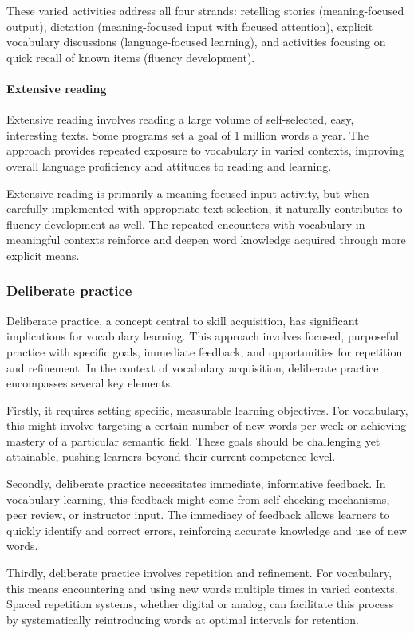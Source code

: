 These varied activities address all four strands: retelling stories (meaning-focused output), dictation (meaning-focused input with focused attention), explicit vocabulary discussions (language-focused learning), and activities focusing on quick recall of known items (fluency development).

\paragraph*{Extensive reading} Extensive reading involves reading a large volume of self-selected, easy, interesting texts. Some programs set a goal of 1 million words a year. The approach provides repeated exposure to vocabulary in varied contexts, improving overall language proficiency and attitudes to reading and learning.

Extensive reading is primarily a meaning-focused input activity, but when carefully implemented with appropriate text selection, it naturally contributes to fluency development as well. The repeated encounters with vocabulary in meaningful contexts reinforce and deepen word knowledge acquired through more explicit means.

\subsubsection{Deliberate practice}\label{sec:delib}

Deliberate practice, a concept central to skill acquisition, has significant implications for vocabulary learning. This approach involves focused, purposeful practice with specific goals, immediate feedback, and opportunities for repetition and refinement. In the context of vocabulary acquisition, deliberate practice encompasses several key elements.

Firstly, it requires setting specific, measurable learning objectives. For vocabulary, this might involve targeting a certain number of new words per week or achieving mastery of a particular semantic field. These goals should be challenging yet attainable, pushing learners beyond their current competence level.

Secondly, deliberate practice necessitates immediate, informative feedback. In vocabulary learning, this feedback might come from self-checking mechanisms, peer review, or instructor input. The immediacy of feedback allows learners to quickly identify and correct errors, reinforcing accurate knowledge and use of new words.

Thirdly, deliberate practice involves repetition and refinement. For vocabulary, this means encountering and using new words multiple times in varied contexts. Spaced repetition systems, whether digital or analog, can facilitate this process by systematically reintroducing words at optimal intervals for retention.

